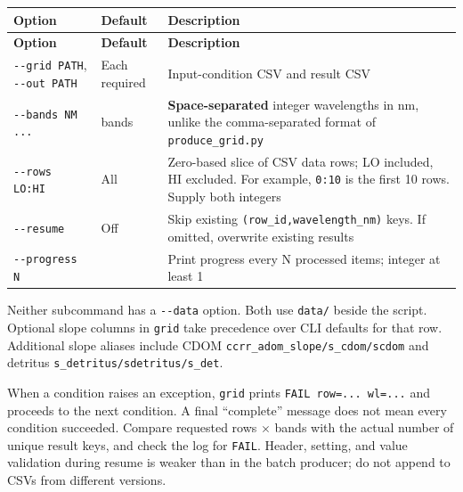 {\TableFont
\begin{longtable}{@{}>{\raggedright\arraybackslash}p{}>{\raggedright\arraybackslash}p{}>{\raggedright\arraybackslash}p{}@{}}
\toprule
\textbf{Option} & \textbf{Default} & \textbf{Description} \\
\midrule
\endfirsthead
\toprule
\textbf{Option} & \textbf{Default} & \textbf{Description} \\
\midrule
\endhead
\bottomrule
\endfoot
\texttt{-\allowbreak{}-\allowbreak{}grid PATH}, \texttt{-\allowbreak{}-\allowbreak{}out PATH} & Each required & Input-condition CSV and result CSV \\
\texttt{-\allowbreak{}-\allowbreak{}bands NM .\allowbreak{}.\allowbreak{}.\allowbreak{}} & 12 bands & \textbf{Space-separated} integer wavelengths in nm, unlike the comma-separated format of \texttt{produce\_\allowbreak{}grid.\allowbreak{}py} \\
\texttt{-\allowbreak{}-\allowbreak{}rows LO:\allowbreak{}HI} & All & Zero-based slice of CSV data rows; LO included, HI excluded. For example, \texttt{0:\allowbreak{}10} is the first 10 rows. Supply both integers \\
\texttt{-\allowbreak{}-\allowbreak{}resume} & Off & Skip existing \texttt{(row\_\allowbreak{}id,\allowbreak{}wavelength\_\allowbreak{}nm)} keys. If omitted, overwrite existing results \\
\texttt{-\allowbreak{}-\allowbreak{}progress N} & 1 & Print progress every N processed items; integer at least 1 \\
\end{longtable}
}

Neither subcommand has a \texttt{-\allowbreak{}-\allowbreak{}data} option. Both use \texttt{data/\allowbreak{}} beside the script. Optional slope columns in \texttt{grid} take precedence over CLI defaults for that row. Additional slope aliases include CDOM \texttt{ccrr\_\allowbreak{}adom\_\allowbreak{}slope/\allowbreak{}s\_\allowbreak{}cdom/\allowbreak{}scdom} and detritus \texttt{s\_\allowbreak{}detritus/\allowbreak{}sdetritus/\allowbreak{}s\_\allowbreak{}det}.

When a condition raises an exception, \texttt{grid} prints \texttt{FAIL row=\allowbreak{}.\allowbreak{}.\allowbreak{}.\allowbreak{} wl=\allowbreak{}.\allowbreak{}.\allowbreak{}.\allowbreak{}} and proceeds to the next condition. A final “complete” message does not mean every condition succeeded. Compare requested rows \ensuremath{\times} bands with the actual number of unique result keys, and check the log for \texttt{FAIL}. Header, setting, and value validation during resume is weaker than in the batch producer; do not append to CSVs from different versions.

